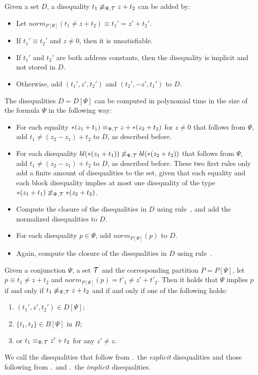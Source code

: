 Given a set $D$, a disequality $t_1 \not\equiv_{\Psi,\mathcal{T}} z + t_2$ can be added by:
\begin{itemize}
\item Let $norm_{P[\Psi]}(t_1 \neq z + t_2) \equiv t_1' = z' + t_2'$.
\item If $t_1' \equiv t_2'$ and $z \neq 0$, then it is unsatisfiable.
\item If $t_1'$ and $t_2'$ are both address constants, then the disequality is implicit and not stored in $D$.
\item Otherwise, add $(t_1', z', t_2')$ and $(t_2', -z', t_1')$ to $D$.
\end{itemize}

The disequalities $D = D[\Psi]$ can be computed in polynomial time in the size of the formula $\Psi$ in the following way:

\begin{itemize}
    \item For each equality $*(z_1 + t_1) \equiv_{\Psi,\mathcal{T}} z + *(z_2 + t_2)$ for $z \neq 0$
          that follows from $\Psi$,
          add $t_1 \neq (z_2 - z_1) + t_2$ to $D$, as described before.
    \item For each disequality $bl(*(z_1 + t_1)) \not\equiv_{\Psi,\mathcal{T}} bl(*(z_2 + t_2))$ that follows from $\Psi$, add $t_1 \neq (z_2 - z_1) + t_2$ to $D$, as described before.
          These two first rules only add a finite amount of disequalities to the set, given that each equality and each block disequality implies at most one disequality of the type $*(z_1 + t_1) \not\equiv_{\Psi,\mathcal{T}} *(z_2 + t_2)$.
    \item Compute the closure of the disequalities in $D$ using rule~, and add the normalized disequalities to $D$.
    \item For each disequality $p \in \Psi$, add $norm_{P[\Psi]}(p)$ to $D$.
    \item Again, compute the closure of the disequalities in $D$ using rule~.
\end{itemize}

Given a conjunction $\Psi$, a set $\mathcal{T}$ and the corresponding partition $P = P[\Psi]$, let $p \equiv t_1 \neq z + t_2$ and $norm_{P[\Psi]}(p) = t'_1 \neq z' + t'_2$.
Then
it holds that $\Psi$ implies $p$ if and only if $t_1 \not\equiv_{\Psi,\mathcal{T}} z + t_2$ and if and only if one of the following holds:

\begin{enumerate}
    \item\label{item:diseqs} $(t_1',z', t_2') \in D[\Psi]$;
    \item\label{item:bl-diseqs} $\{t_1,t_2\} \in B[\Psi]$ in $B$;
    \item\label{item:eqs} or $t_1 \equiv_{\Psi,\mathcal{T}} z' + t_2$ for any $z' \neq z$.
\end{enumerate}
We call the disequalities that follow from .\ the \emph{explicit} disequalities and those following from .\ and .\ the \emph{implicit} disequalities.
